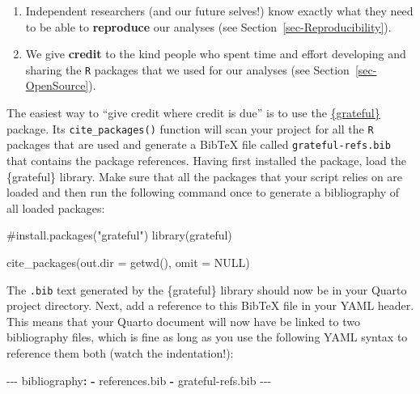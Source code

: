\documentclass[
  letterpaper,
  DIV=11,
  numbers=noendperiod]{scrreprt}
\newenvironment{Shaded}{\begin{snugshade}}{\end{snugshade}}
\newcommand{\AttributeTok}[1]{\textcolor[rgb]{0.40,0.45,0.13}{#1}}
\newcommand{\CommentTok}[1]{\textcolor[rgb]{0.37,0.37,0.37}{#1}}
\newcommand{\ConstantTok}[1]{\textcolor[rgb]{0.56,0.35,0.01}{#1}}
\newcommand{\FunctionTok}[1]{\textcolor[rgb]{0.28,0.35,0.67}{#1}}
\newcommand{\KeywordTok}[1]{\textcolor[rgb]{0.00,0.23,0.31}{\textbf{#1}}}
\newcommand{\NormalTok}[1]{\textcolor[rgb]{0.00,0.23,0.31}{#1}}
\newcommand{\PreprocessorTok}[1]{\textcolor[rgb]{0.68,0.00,0.00}{#1}}
\providecommand{\tightlist}{%
  \setlength{\itemsep}{0pt}\setlength{\parskip}{0pt}}
\begin{document}
\begin{enumerate}
\def\labelenumi{\arabic{enumi}.}
\tightlist
\item
  Independent researchers (and our future selves!) know exactly what
  they need to be able to \textbf{reproduce} our analyses (see
  Section~\ref{sec-Reproducibility}).
\item
  We give \textbf{credit} to the kind people who spent time and effort
  developing and sharing the \texttt{R} packages that we used for our
  analyses (see Section~\ref{sec-OpenSource}).
\end{enumerate}

The easiest way to ``give credit where credit is due'' is to use the
\href{https://pakillo.github.io/grateful/}{\{grateful\}} package. Its
\texttt{cite\_packages()} function will scan your project for all the
\texttt{R} packages that are used and generate a BibTeX file called
\texttt{grateful-refs.bib} that contains the package references. Having
first installed the package, load the \{grateful\} library. Make sure
that all the packages that your script relies on are loaded and then run
the following command once to generate a bibliography of all loaded
packages:

\begin{Shaded}
\begin{Highlighting}[]
\CommentTok{\#install.packages("grateful")}
\FunctionTok{library}\NormalTok{(grateful)}

\FunctionTok{cite\_packages}\NormalTok{(}\AttributeTok{out.dir =} \FunctionTok{getwd}\NormalTok{(),}
              \AttributeTok{omit =} \ConstantTok{NULL}\NormalTok{)}
\end{Highlighting}
\end{Shaded}

The \texttt{.bib} text generated by the \{grateful\} library should now
be in your Quarto project directory. Next, add a reference to this
BibTeX file in your YAML header. This means that your Quarto document
will now have be linked to two bibliography files, which is fine as long
as you use the following YAML syntax to reference them both (watch the
indentation!):

\begin{Shaded}
\begin{Highlighting}[]
\PreprocessorTok{{-}{-}{-}}
\FunctionTok{bibliography}\KeywordTok{:}\AttributeTok{ }
\AttributeTok{  }\KeywordTok{{-}}\AttributeTok{ references.bib}
\AttributeTok{  }\KeywordTok{{-}}\AttributeTok{ grateful{-}refs.bib}
\PreprocessorTok{{-}{-}{-}}
\end{Highlighting}
\end{Shaded}
\end{document}
